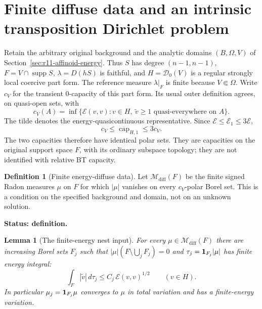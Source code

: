 \documentclass[11pt,a4paper]{article}
\numberwithin{equation}{section}
\newtheorem{lemma}[theorem]{Lemma}
\theoremstyle{definition}
\newtheorem{definition}[theorem]{Definition}
\theoremstyle{remark}
\begin{document}


\section{Finite diffuse data and an intrinsic transposition Dirichlet problem}
\label{sec:r11-diffuse-dirichlet}

Retain the arbitrary original background and the analytic domains
$(B,\Omega,V)$ of Section~\ref{sec:r11-affinoid-energy}.  Thus
$S$ has degree $(n-1,n-1)$, $F=V\cap\operatorname{supp}S$,
$\lambda=D(hS)$ is faithful, and
$H=\mathscr D_0(V)$ is a regular strongly local coercive part form.
The reference measure $\lambda|_F$ is finite because $V\Subset\Omega$.
Write $c_V$ for the transient $0$-capacity of this part form.
Its usual outer definition agrees, on quasi-open sets, with
\[
 c_V(A)=\inf\{\mathcal E(v,v):v\in H,\ 
                              \widetilde v\geq1\text{ quasi-everywhere on }A\}.
 \tag{MD1}
\]
The tilde denotes the energy-quasicontinuous representative.
Since $\mathcal E\leq\mathcal E_1\leq3\mathcal E$,
\[
                    c_V\leq\operatorname{cap}_{H,1}\leq3c_V.
 \tag{MD2}
\]
The two capacities therefore have identical polar sets.
They are capacities on the original support space $F$, with
its ordinary subspace topology; they are not identified with
relative BT capacity.

\begin{definition}[Finite energy-diffuse data]
\label{def:r11-energy-diffuse-data}
Let $\mathcal M_{\mathrm{diff}}(F)$ be the finite signed Radon
measures $\mu$ on $F$ for which $|\mu|$ vanishes on every
$c_V$-polar Borel set.  This is a condition on the specified
background and domain, not on an unknown solution.
\end{definition}

\noindent\textbf{Status: definition.}

\begin{lemma}[The finite-energy nest input]
\label{lem:r11-finite-energy-nest}
For every $\mu\in\mathcal M_{\mathrm{diff}}(F)$ there are increasing
Borel sets $F_j$ such that
$|\mu|(F\setminus\bigcup_jF_j)=0$ and
$\tau_j={\bf1}_{F_j}|\mu|$ has finite energy integral:
\[
             \int_F|\widetilde v|\,d\tau_j
                         \leq C_j\,\mathcal E(v,v)^{1/2}
                                  \qquad(v\in H).
 \tag{MD3}
\]
In particular $\mu_j={\bf1}_{F_j}\mu$ converges to $\mu$ in
total variation and has a finite-energy variation.
\end{lemma}
\end{document}
